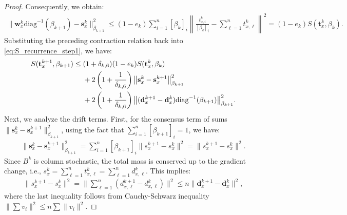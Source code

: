\documentclass{article}
\theoremstyle{plain}
\theoremstyle{definition}
\theoremstyle{remark}
\begin{document}
\begin{proof}
Consequently, we obtain:
\begin{align*}
    \|\mathbf{w}_{x}^{k}\mathrm{diag}^{-1}(\beta_{k+1})-\mathbf{s}_{x}^{k}\|_{\beta_{k+1}}^{2}
    \leq (1-e_{k})\sum_{i=1}^{n}[\beta_{k}]_{i}\left\|\frac{t_{x,i}^k}{[\beta_{k}]_{i}}-\sum_{\ell=1}^{n}t_{x,\ell}^k\right\|^{2}
    = (1-e_{k}) S(\mathbf{t}_{x}^{k},\beta_{k}).
\end{align*}
Substituting the preceding contraction relation back into \eqref{eq:S_recurrence_step1}, we have:
\begin{align}\label{eq:S_recurrence_step2}
    S(\mathbf{t}_{x}^{k+1},\beta_{k+1}) \leq{}& (1+\delta_{k,6})(1-e_{k})S(\mathbf{t}_{x}^{k},\beta_{k}) \notag \\
    &+ 2\left(1+\frac{1}{\delta_{k,6}}\right)\big\|\mathbf{s}_{x}^{k}-\mathbf{s}_{x}^{k+1}\big\|_{\beta_{k+1}}^{2} \notag \\
    &+ 2\left(1+\frac{1}{\delta_{k,6}}\right)\big\|(\mathbf{d}_{x}^{k+1}-\mathbf{d}_{x}^{k})\mathrm{diag}^{-1}(\beta_{k+1})\big\|_{\beta_{k+1}}^{2}.
\end{align}
Next, we analyze the drift terms. First, for the consensus term of sums $\|\mathbf{s}_{x}^{k}-\mathbf{s}_{x}^{k+1}\|_{\beta_{k+1}}^{2}$, using the fact that $\sum_{i=1}^n [\beta_{k+1}]_i = 1$, we have:
\begin{align*}
    \|\mathbf{s}_{x}^{k}-\mathbf{s}_{x}^{k+1}\|_{\beta_{k+1}}^{2} = \sum_{i=1}^n[\beta_{k+1}]_i\|s_{x}^{k+1}-s_{x}^k\|^2 = \|s_{x}^{k+1}-s_{x}^k\|^{2}.
\end{align*}
Since $B^k$ is column stochastic, the total mass is conserved up to the gradient change, i.e., $s_{x}^{k}=\sum_{\ell=1}^{n}t_{x,\ell}^{k}=\sum_{\ell=1}^{n}d_{x,\ell}^{k}$. This implies:
\begin{align*}
    \|s_{x}^{k+1}-s_{x}^k\|^{2} = \bigg\|\sum_{\ell=1}^{n}(d_{x,\ell}^{k+1}-d_{x,\ell}^{k})\bigg\|^{2} \leq n \|\mathbf{d}_{x}^{k+1}-\mathbf{d}_{x}^{k}\|^{2},
\end{align*}
where the last inequality follows from Cauchy-Schwarz inequality $\|\sum v_i\|^2 \leq n \sum \|v_i\|^2$.


\end{proof}
\end{document}

